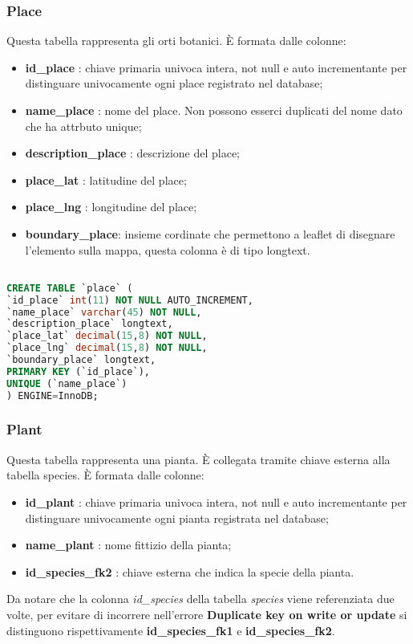\subsubsection{Place}
Questa tabella rappresenta gli orti botanici. \newline
È formata dalle colonne:
\begin{itemize}
\item \textbf{id\_place} : chiave primaria univoca intera, not null e auto incrementante per distinguare univocamente ogni place registrato nel database;
\item \textbf{name\_place} : nome del place. Non possono esserci duplicati del nome dato che ha attrbuto unique;
\item \textbf{description\_place} : descrizione del place;		
\item \textbf{place\_lat} : latitudine del place;
\item \textbf{place\_lng} : longitudine del place;
\item \textbf{boundary\_place}: insieme cordinate che permettono a leaflet di disegnare l'elemento sulla mappa, questa colonna è di tipo longtext.
\end{itemize}

\begin{lstlisting}[language=SQL, caption=Codice SQL della Place Photos]

CREATE TABLE `place` (
`id_place` int(11) NOT NULL AUTO_INCREMENT,
`name_place` varchar(45) NOT NULL,
`description_place` longtext,
`place_lat` decimal(15,8) NOT NULL,
`place_lng` decimal(15,8) NOT NULL,
`boundary_place` longtext,
PRIMARY KEY (`id_place`),
UNIQUE (`name_place`)
) ENGINE=InnoDB;

\end{lstlisting}

\subsubsection{Plant}
Questa tabella rappresenta una pianta. È collegata tramite chiave esterna alla tabella species. \newline
È formata dalle colonne:
\begin{itemize}
\item \textbf{id\_plant} : chiave primaria univoca intera, not null e auto incrementante per distinguare univocamente ogni pianta registrata nel database;
\item \textbf{name\_plant} : nome fittizio della pianta;
\item \textbf{id\_species\_fk2} : chiave esterna che indica la specie della pianta.
\end{itemize}
Da notare che la colonna \textit{id\_species} della tabella \textit{species} viene referenziata due volte, per evitare di incorrere nell'errore \textbf{Duplicate key on write or update} si distinguono rispettivamente \textbf{id\_species\_fk1} e \textbf{id\_species\_fk2}.

